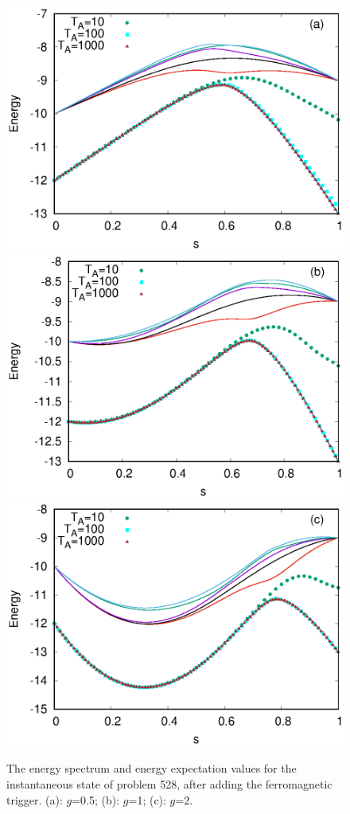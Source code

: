 \documentclass[../main.tex]{subfiles}
\begin{document}
\begin{figure}[H]
\centering 
\includegraphics[scale=0.8]{528_s12_F_g0.eps}
\includegraphics[scale=0.8]{528_s12_F_g1.eps}
\includegraphics[scale=0.8]{528_s12_F_g2.eps}
\caption{The energy spectrum and energy expectation values for the instantaneous state of problem 528, after adding the ferromagnetic trigger. (a): $g$=0.5; (b): $g$=1; (c): $g$=2.}
\label{fig:f7}
\end{figure}
\end{document}
